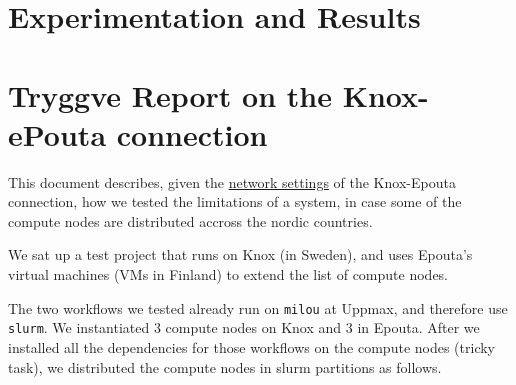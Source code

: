 \section{Experimentation and Results}
\label{section:experiments}

\cutafter

\section{Tryggve Report on the Knox-ePouta
connection}\label{tryggve-report-on-the-knox-epouta-connection}

This document describes, given the \href{./docs.md}{network settings} of
the Knox-Epouta connection, how we tested the limitations of a system,
in case some of the compute nodes are distributed accross the nordic
countries.

We sat up a test project that runs on Knox (in Sweden), and uses
Epouta's virtual machines (VMs in Finland) to extend the list of compute
nodes.

The two workflows we tested already run on \texttt{milou} at Uppmax, and
therefore use \texttt{slurm}. We instantiated 3 compute nodes on Knox
and 3 in Epouta. After we installed all the dependencies for those
workflows on the compute nodes (tricky task), we distributed the compute
nodes in slurm partitions as follows.

